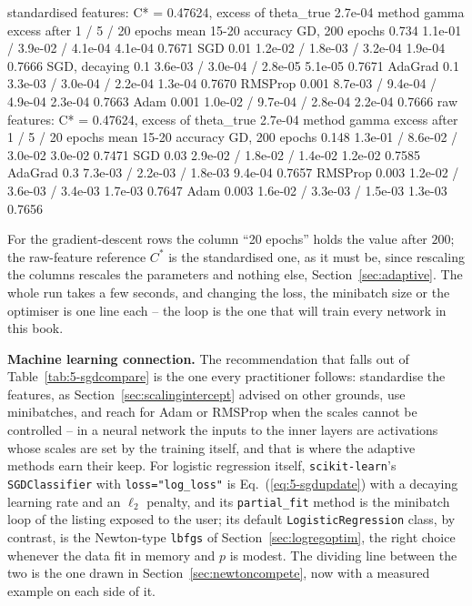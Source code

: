 \begin{Python}{}
standardised features: C* = 0.47624, excess of theta_true 2.7e-04
  method           gamma    excess after 1 / 5 / 20 epochs   mean 15-20   accuracy
  GD, 200 epochs   0.734    1.1e-01 / 3.9e-02 / 4.1e-04      4.1e-04     0.7671
  SGD              0.01     1.2e-02 / 1.8e-03 / 3.2e-04      1.9e-04     0.7666
  SGD, decaying    0.1      3.6e-03 / 3.0e-04 / 2.8e-05      5.1e-05     0.7671
  AdaGrad          0.1      3.3e-03 / 3.0e-04 / 2.2e-04      1.3e-04     0.7670
  RMSProp          0.001    8.7e-03 / 9.4e-04 / 4.9e-04      2.3e-04     0.7663
  Adam             0.001    1.0e-02 / 9.7e-04 / 2.8e-04      2.2e-04     0.7666
raw features: C* = 0.47624, excess of theta_true 2.7e-04
  method           gamma    excess after 1 / 5 / 20 epochs   mean 15-20   accuracy
  GD, 200 epochs   0.148    1.3e-01 / 8.6e-02 / 3.0e-02      3.0e-02     0.7471
  SGD              0.03     2.9e-02 / 1.8e-02 / 1.4e-02      1.2e-02     0.7585
  AdaGrad          0.3      7.3e-03 / 2.2e-03 / 1.8e-03      9.4e-04     0.7657
  RMSProp          0.003    1.2e-02 / 3.6e-03 / 3.4e-03      1.7e-03     0.7647
  Adam             0.003    1.6e-02 / 3.3e-03 / 1.5e-03      1.3e-03     0.7656
\end{Python}

For the gradient-descent rows the column ``20 epochs'' holds the value
after $200$; the raw-feature reference $C^{*}$ is the standardised one, as
it must be, since rescaling the columns rescales the parameters and
nothing else, Section~\ref{sec:adaptive}.  The whole run takes a few
seconds, and changing the loss, the minibatch size or the optimiser is one
line each -- the loop is the one that will train every network in this
book.

\begin{notebox}
\textbf{Machine learning connection.}  The recommendation that falls out of
Table~\ref{tab:5-sgdcompare} is the one every practitioner follows:
standardise the features, as Section~\ref{sec:scalingintercept} advised on
other grounds, use minibatches, and reach for Adam or RMSProp when the
scales cannot be controlled -- in a neural network the inputs to the inner
layers are activations whose scales are set by the training itself, and
that is where the adaptive methods earn their keep.  For logistic
regression itself, \texttt{scikit-learn}'s \texttt{SGDClassifier} with
\texttt{loss="log\_loss"} is Eq.~(\ref{eq:5-sgdupdate}) with a decaying
learning rate and an $\ell_2$ penalty, and its \texttt{partial\_fit} method
is the minibatch loop of the listing exposed to the user; its default
\texttt{LogisticRegression} class, by contrast, is the Newton-type
\texttt{lbfgs} of Section~\ref{sec:logregoptim}, the right choice whenever
the data fit in memory and $p$ is modest.  The dividing line between the
two is the one drawn in Section~\ref{sec:newtoncompete}, now with a
measured example on each side of it.
\end{notebox}

